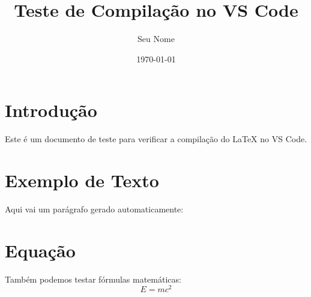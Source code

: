 \documentclass{article}
\title{Teste de Compilação no VS Code}
\author{Seu Nome}
\date{\today}
\begin{document}
\maketitle

\section{Introdução}
Este é um documento de teste para verificar a compilação do \LaTeX{} no VS Code.

\section{Exemplo de Texto}
Aqui vai um parágrafo gerado automaticamente:

\lipsum[1]

\section{Equação}
Também podemos testar fórmulas matemáticas:
\[
    E = mc^2
\]
\end{document}
